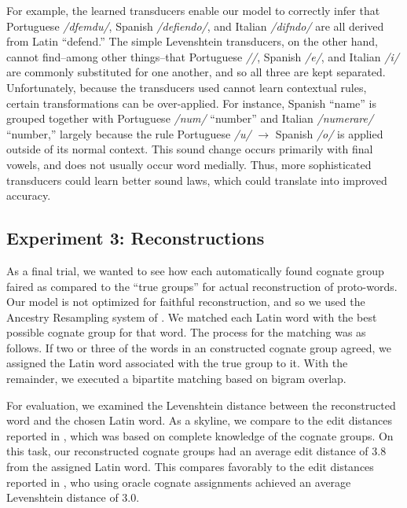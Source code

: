\documentclass[11pt,a4paper]{article}
\begin{document}
For example, the learned transducers enable our model to correctly
infer that Portuguese \textit{/dfemdu/}, Spanish
\textit{/defiendo/}, and Italian \textit{/difndo/} are
all derived from Latin \textit{} ``defend.''
The simple Levenshtein transducers, on the other hand, cannot
find--among other things--that Portuguese \textit{//},
Spanish \textit{/e/}, and Italian \textit{/i/} are commonly substituted
for one another, and so all three are kept separated. Unfortunately,
because the transducers used cannot learn contextual rules, certain
transformations can be over-applied.  For instance, Spanish
\textit{} ``name'' is grouped together with
Portuguese \textit{/num/} ``number'' and Italian
\textit{/numerare/} ``number,'' largely because the rule Portuguese
\textit{/u/} $\to$ Spanish \textit{/o/} is applied outside of its
normal context. This sound change occurs primarily with final vowels,
and does not usually occur  word medially. Thus, more sophisticated
transducers could learn better sound laws, which could translate
into improved accuracy.

\subsection{Experiment 3: Reconstructions}

As a final trial, we wanted to see how each automatically found
cognate group faired as compared to the ``true groups'' for actual
reconstruction of proto-words. Our model is not optimized for
faithful reconstruction, and so we used the Ancestry Resampling
system of . We matched each Latin word
with the best possible cognate group for that word. The process for
the matching was as follows. If two or three of the words in an
constructed cognate group agreed, we assigned the Latin word
associated with the true group to it. With the remainder, we executed
a bipartite matching based on bigram overlap.

For evaluation, we examined the Levenshtein distance between the
reconstructed word and the chosen Latin word. As a skyline, we
compare to the edit distances reported in ,
which was based on complete knowledge of the cognate groups. On
this task, our reconstructed cognate groups had an average edit
distance of 3.8 from the assigned Latin word. This compares favorably to the
edit distances reported in , who using oracle
cognate assignments achieved an average Levenshtein distance of 3.0.
\end{document}
